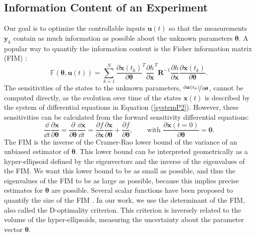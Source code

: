 \subsection{Information Content of an Experiment}
\label{secFIM2}
Our goal is to optimize the controllable inputs $\bm u(t)$ so that the measurements $\bm y_k$ contain as much information as possible about the unknown parameters $\bm \theta$. A popular way to quantify the information content is the Fisher information matrix (FIM) \parencite{fedorov, walter}:
\begin{equation}
\mathbb{F}(\bm \theta, \bm u(t))= \sum_{k=1}^N
\frac{\partial \bm x(t_k)}{\partial \bm \theta}^T
\frac{\partial h}{\partial \bm x}^T
\bm R^{-1}
\frac{\partial h}{\partial \bm x}
\frac{\partial \bm x(t_k)}{\partial \bm \theta}.
\label{FIM}
\end{equation}
The sensitivities of the states to the unknown parameters, $\nicefrac{\partial \bm x(t_k)}{\partial \bm \theta}$, cannot be computed directly, as the evolution over time of the states $\bm x(t)$ is described by the system of differential equations in Equation (\ref{systemP2}). However, these sensitivities can be calculated from the forward sensitivity differential equations:
\begin{equation}
\frac{\dd}{\dd t} \frac{\partial \bm x}{\partial \bm \theta}
=  \frac{\partial}{\partial \bm \theta}\frac{\dd \bm x}{\dd t}
= \frac{\partial f}{\partial \bm x}\frac{\partial \bm x}{\partial \bm \theta}
+ \frac{\partial f}{\partial \bm \theta},
\qquad \text{with } \frac{\partial \bm x(t=0)}{\partial \bm \theta} = \bm 0.
\label{sens}
\end{equation}
The FIM is the inverse of the Cramer-Rao lower bound of the variance of an unbiased estimator of $\bm \theta$. This lower bound can be interpreted geometrically as a hyper-ellipsoid defined by the eigenvectors and the inverse of the eigenvalues of the FIM. We want this lower bound to be as small as possible, and thus the eigenvalues of the FIM to be as large as possible, because this implies precise estimates for $\bm \theta$ are possible. {\color{red}Several scalar functions have been proposed to} quantify the size of the FIM \parencite{atkinson}. In our work, we use the determinant of the FIM, also called the D-optimality criterion. This criterion is inversely related to the volume of the hyper-ellipsoids, measuring the uncertainty about the parameter vector $\bm \theta$.
